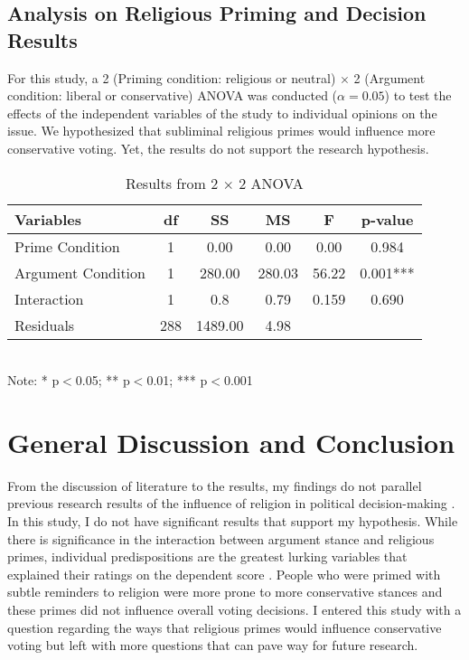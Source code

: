 \documentclass[letterpaper,man,natbib,noextraspace,12pt]{apa6}  %
\newcommand\tb{\textbf}
\begin{document}
\subsection{Analysis on Religious Priming and Decision Results}

For this study, a 2 (Priming condition: religious or neutral) $\times$ 2 (Argument condition: liberal or conservative) ANOVA was conducted ($\alpha = 0.05$) to test the effects of the independent variables of the study to individual opinions on the issue. We hypothesized that subliminal religious primes would influence more conservative voting. Yet, the results do not support the research hypothesis. 

\begin{table}
	\caption{Results from 2 $\times$ 2 ANOVA}\label{AnovaResults}
	\begin{tabular}{lccccc}
		\hline
		\tb{Variables}&\tb{df}&\tb{SS}&\tb{MS}&\tb{F}&\tb{p-value}\\
		\hline
		Prime Condition&1&0.00&0.00&0.00&0.984\\
		Argument Condition&1&280.00&280.03&56.22&0.001***\\
		Interaction&1&0.8&0.79&0.159&0.690\\
		Residuals&288&1489.00&4.98&&\\
		\hline
	\end{tabular}\\
	Note: * p$<$0.05; ** p$<$0.01; *** p$<$0.001
\end{table}

\section{General Discussion and Conclusion}

From the discussion of literature to the results, my findings do not parallel previous research results of the influence of religion in political decision-making \citep{calfano_god_2009, rutchick_deus_2010}. In this study, I do not have significant results that support my hypothesis. While there is significance in the interaction between argument stance and religious primes, individual predispositions are the greatest lurking variables that explained their ratings on the dependent score \citep{mclaughlin_cueing_2014}. People who were primed with subtle reminders to religion were more prone to more conservative stances and these primes did not influence overall voting decisions. I entered this study with a question regarding the ways that religious primes would influence conservative voting but left with more questions that can pave way for future research. 
\end{document}
